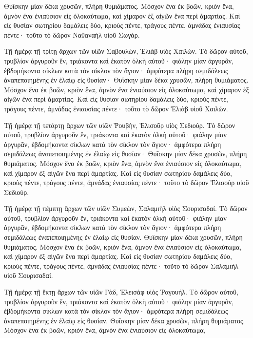 {Θυΐσκην μίαν δέκα χρυσῶν, πλήρη θυμιάματος.
Μόσχον ἔνα ἐκ βοῶν, κριὸν ἕνα, ἀμνὸν ἕνα ἐνιαύσιον εἰς ὁλοκαύτωμα,
καὶ χίμαρον ἐξ αἰγῶν ἕνα περὶ ἁμαρτίας.
Καὶ εἰς θυσίαν σωτηρίου δαμάλεις δύο, κριοὺς πέντε, τράγους πέντε, ἀμνάδας ἐνιαυσίας πέντε· τοῦτο τὸ δῶρον Ναθαναὴλ υἱοῦ Σωγάρ.
\par }{\PP {}Τῇ ἡμέρᾳ τῇ τρίτῃ ἄρχων τῶν υἱῶν Σαβουλὼν, Ἑλιὰβ υἱὸς Χαιλών.
Τὸ δῶρον αὐτοῦ, τρυβλίον ἀργυροῦν ἕν, τριάκοντα καὶ ἑκατὸν ὁλκὴ αὐτοῦ· φιάλην μίαν ἀργυρᾶν, ἑβδομήκοντα σίκλων κατὰ τὸν σίκλον τὸν ἅγιον· ἀμφότερα πλήρη σεμιδάλεως ἀναπεποιημένης ἐν ἐλαίῳ εἰς θυσίαν·
Θυΐσκην μίαν δέκα χρυσῶν, πλήρη θυμιάματος.
Μόσχον ἕνα ἐκ βοῶν, κριὸν ἕνα, ἀμνὸν ἕνα ἐνιαύσιον εἰς ὁλοκαύτωμα,
καὶ χίμαρον ἐξ αἰγῶν ἕνα περὶ ἁμαρτίας.
Καὶ εἰς θυσίαν σωτηρίου δαμάλεις δύο, κριοὺς πέντε, τράγους πέντε, ἀμνάδας ἐνιαυσίας πέντε· τοῦτο τὸ δῶρον Ἑλιὰβ υἱοῦ Χαιλών.
\par }{\PP {}Τῇ ἡμέρᾳ τῇ τετάρτῃ ἄρχων τῶν υἱῶν Ῥουβὴν, Ἑλισοῦρ υἱὸς Σεδιούρ.
Τὸ δῶρον αὐτοῦ, τρυβλίον ἀργυροῦν ἓν, τριάκοντα καὶ ἑκατὸν ὁλκὴ αὐτοῦ· φιάλην μίαν ἀργυρᾶν, ἑβδομήκοντα σίκλων κατὰ τὸν σίκλον τὸν ἅγιον· ἀμφότερα πλήρη σεμιδάλεως ἀναπεποιημένης ἐν ἐλαίῳ εἰς θυσίαν·
Θυΐσκην μίαν δέκα χρυσῶν, πλήρη θυμιάματος.
Μόσχον ἕνα ἐκ βοῶν, κριὸν ἕνα, ἀμνὸν ἕνα ἐνιαύσιον εἰς ὁλοκαύτωμα,
καὶ χίμαρον ἐξ αἰγῶν ἕνα περὶ ἁμαρτίας.
Καὶ εἰς θυσίαν σωτηρίου δαμάλεις δύο, κριοὺς πέντε, τράγους πέντε, ἀμνάδας ἐνιαυσίας πέντε· τοῦτο τὸ δῶρον Ἑλισοὺρ υἱοῦ Σεδιούρ.
\par }{\PP {}Τῇ ἡμέρᾳ τῇ πέμπτῃ ἄρχων τῶν υἱῶν Συμεὼν, Σαλαμιὴλ υἱὸς Σουρισαδαί.
Τὸ δῶρον αὐτοῦ, τρυβλίον ἀργυροῦν ἓν, τριάκοντα καὶ ἑκατὸν ὁλκὴ αὐτοῦ· φιάλην μίαν ἀργυρᾶν, ἑβδομήκοντα σίκλων κατὰ τὸν σίκλον τὸν ἅγιον· ἀμφότερα πλήρη σεμιδάλεως ἐναπεποιημένης ἐν ἐλαίῳ εἰς θυσίαν.
Θυϊσκην μίαν δέκα χρυσῶν, πλήρη θυμιάματος.
Μόσχον ἕνα ἐκ βοῶν, κριὸν ἕνα, ἀμνὸν ἕνα ἐνιαύσιον εἰς ὁλοκαύτωμα,
καὶ χίμαρον ἐξ αἰγῶν ἕνα περὶ ἁμαρτίας.
Καὶ εἰς θυσίαν σωτηρίου δαμάλεις δύο, κριοὺς πέντε, τράγους πέντε, ἀμνάδας ἐνιαυσίας πέντε· τοῦτο τὸ δῶρον Σαλαμιὴλ υἱοῦ Σουρισαδαί.
\par }{\PP {}Τῇ ἡμέρᾳ τῇ ἕκτῃ ἄρχων τῶν υἱῶν Γὰδ, Ἐλεισὰφ υἱὸς Ῥαγουήλ.
Τὸ δῶρον αὐτοῦ, τρυβλίον ἀργυροῦν ἕν, τριάκοντα καὶ ἑκατὸν ὁλκὴ αὐτοῦ· φιάλην μίαν ἀργυρᾶν, ἑβδομήκοντα σίκλων κατὰ τὸν σίκλον τὸν ἅγιον· ἀμφότερα πλήρη σεμιδάλεως ἀναπεποιημένης ἐν ἐλαίῳ εἰς θυσίαν.
Θυΐσκην μίαν δέκα χρυσῶν, πλήρη θυμιάματος.
Μόσχον ἕνα ἐκ βοῶν, κριὸν ἕνα, ἀμνὸν ἕνα ἐνιαύσιον εἰς ὁλοκαύτωμα,
}
